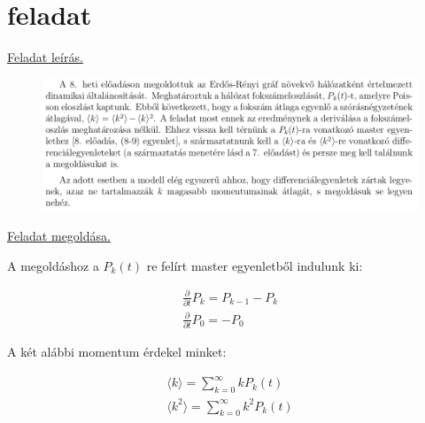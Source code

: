 \documentclass[a4paper, 12pt]{article}
\numberwithin{equation}{section}          %
\numberwithin{figure}{subsection}
\begin{document}
\newpage


\thispagestyle{empty}  

\section{feladat}

\begin{center}
\underline{Feladat leírás.}
\end{center}

\begin{figure}[h!]
	\begin{center}
		\includegraphics[width=1\textwidth]{elso.png}
	\end{center}
\end{figure}




\begin{center}
\underline{Feladat megoldása.}
\end{center}
\hspace{5cm}

A megoldáshoz a $P_k(t)$ re felírt master egyenletből indulunk ki:

\begin{center}
	\begin{gather*}
	\frac{\partial}{\partial t}P_k = P_{k-1} - P_k \\
	\frac{\partial}{\partial t}P_0 = -P_0
	\end{gather*}
\end{center}

A két alábbi momentum érdekel minket:

\begin{center}
	\begin{gather*}
	\langle k \rangle = \sum_{k =0}^{\infty}k P_k(t) \\
	\langle k^2 \rangle = \sum_{k =0}^{\infty}k^2 P_k(t)
	\end{gather*}
\end{center}
\end{document}
